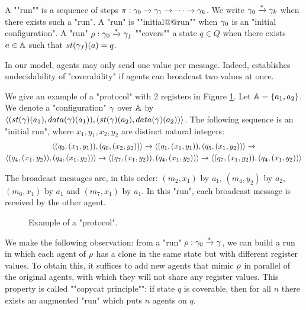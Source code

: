 \begin{definition}[Semantics]
	\AP A ""run"" is a sequence of steps $\pi : \gamma_0 \xrightarrow{} \gamma_1 \xrightarrow{} \cdots \xrightarrow{} \gamma_k$. 
	We write $\gamma_0 \xrightarrow{*} \gamma_k$ when there exists such a "run".
	A "run" is ""initial@@run"" when $\gamma_0$ is an "initial configuration".  
	A "run" $\rho: \gamma_0 \xrightarrow{*} \gamma_f$ ""covers"" a state $q \in Q$ when there exists $a \in \mathbb{A}$ such that $\st{\config_f}(a) = q$. 
\end{definition}
\begin{remark}
\label{rem:several_values_per_message}
In our model, agents may only send one value per message. Indeed, \cite{DelzannoST13} establishes undecidability of "coverability" if agents can broadcast two values at once.
\end{remark}

\begin{example}\label{ex:example-1}
	We give an example of a "protocol" with 2 registers in Figure \ref{fig:ex1}. 
	Let $\mathbb{A} = \{a_1, a_2\}$. We denote a "configuration" $\gamma$ over $\mathbb{A}$ by $\tuple{(\st{\config}(a_1), \data{\config}(a_1)), (\st{\config}(a_2),\data{\config}(a_2))}$. The following sequence is an "initial run", where $x_1,y_1,x_2,y_2$ are distinct natural integers: \vspace{-0,3cm}
	\begin{multline*}
	\langle (q_0, (x_1,y_1)), (q_0,(x_2,y_2)) \rangle \xrightarrow{} \langle (q_1, (x_1,y_1)), (q_5,(x_1,y_2)) \rangle \xrightarrow{} \\ 
	\langle (q_4, (x_1,y_2)), (q_4,(x_1,y_2)) \rangle \xrightarrow{} \langle (q_7, (x_1,y_2)), (q_4,(x_1,y_2)) \rangle \xrightarrow{} \langle (q_7, (x_1,y_2)), (q_4,(x_1,y_2)) \rangle
	\end{multline*} \vspace{-0,6cm}

	The broadcast messages are, in this order: $(m_2,x_1)$ by $a_1$, $(m_4,y_2)$ by $a_2$, $(m_6,x_1)$ by $a_1$ and $(m_7,x_1)$ by $a_1$. In this "run", each broadcast message is received by the other agent. 
\end{example}

\begin{figure}[t]
	
	\caption{Example of a "protocol".}\label{fig:ex1}
\end{figure}
	
	


\begin{remark}
	\label{rem:copycat-principle}
	We make the following observation: from a "run" $\rho : \gamma_0 \xrightarrow{\ast} \gamma$, we can build a run in which each agent of $\rho$ has  a clone in the same state but with different register values. To obtain this, it suffices to add new agents that mimic $\rho$ in parallel of the original agents, with which they will not share any register values.  This property is called ""copycat principle"": if state $q$ is coverable, then for all $n$ there exists an augmented "run" which puts $n$ agents on $q$.
\end{remark}

